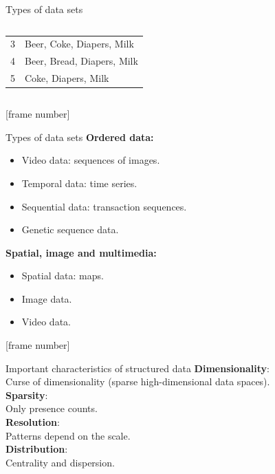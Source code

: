 \documentclass[aspectratio=169,t]{beamer}
\begin{document}
{\begin{frame}{Types of data sets}
\begin{columns}
\begin{column}{0.45\textwidth}
\begin{table}
\begin{tabular} { | c | l |}
          3 & Beer, Coke, Diapers, Milk\\
          4 & Beer, Bread, Diapers, Milk\\
          5 & Coke, Diapers, Milk \\
          \hline
          \end{tabular}
        \end{table}
        \end{column}
      \end{columns}
    \end{frame}
  }

  {
    [frame number]
    \begin{frame}{Types of data sets}
          \textbf{Ordered data:}
          \begin{itemize}[noitemsep]
              \item Video data: sequences of images.
              \item Temporal data: time series.
              \item Sequential data: transaction sequences.
              \item Genetic sequence data.
          \end{itemize}
          \textbf{Spatial, image and multimedia:}
          \begin{itemize}[noitemsep]
              \item Spatial data: maps.
              \item Image data.
              \item Video data.
          \end{itemize}
    \end{frame}
  }

  {
    [frame number]
    \begin{frame}{Important characteristics of structured data}
        \textbf{Dimensionality}:\\
        Curse of dimensionality (sparse high-dimensional data spaces).\\[0.2cm]

        \textbf{Sparsity}:\\
        Only presence counts.\\[0.2cm]

        \textbf{Resolution}:\\
        Patterns depend on the scale.\\[0.2cm]

        \textbf{Distribution}:\\
        Centrality and dispersion.
    \end{frame}
  }
\end{document}
